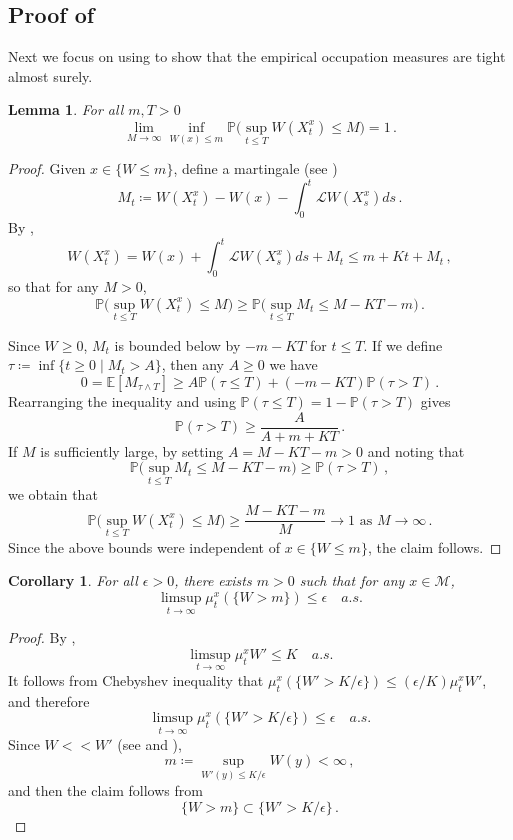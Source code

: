 \documentclass[final]{amsart}
\newtheorem{lem}[thm]{Lemma}
\newtheorem{cor}[thm]{Corollary}
\numberwithin{thm}{section}
\numberwithin{equation}{section}
\newcommand{\E}{\mathbb{E}}
\newcommand{\Prb}{\mathbb{P}}
\newcommand{\mcM}{\mathcal{M}}
\newcommand{\Ll}{\mathcal{L}}
\begin{document}
\subsection{Proof of }
Next we focus on using  to show that the empirical occupation measures are tight almost surely.

\begin{lem} \label{W-small-M}
For all $m, T > 0$
 \begin{equation*}
        \lim_{M \to \infty} \inf_{W(x) \leq m} \Prb\Big(\sup_{t \leq T}W(X_t^x) \leq M \Big) = 1 \,.
    \end{equation*}
\end{lem}

\begin{proof}
    Given $x \in \{W \leq m\}$, define a martingale (see )
    $$
    M_t \coloneqq W(X_t^x) - W(x) - \int_0^t \Ll W(X_s^x)ds \,.
    $$
     By , 
     $$
     W(X_t^x) = W(x) + \int_0^t \Ll W(X_s^x)ds + M_t \leq m + Kt + M_t \,,
     $$ 
     so that for any $M > 0$, 
     $$
     \Prb\Big(\sup_{t \leq T}W(X_t^x) \leq M \Big) \geq \Prb\Big(\sup_{t \leq T} M_t \leq M - KT - m\Big) \,.
     $$

    Since $W \geq 0$,  $M_t$ is bounded below by $-m - KT$ for $t \leq T$. If we define $\tau \coloneqq \inf\{t \geq 0 \mid M_t > A\}$, then 
     any $A \geq 0$ we have  
    $$
    0 = \E[M_{\tau \wedge T}] \geq A\Prb(\tau \leq T) + (-m - KT)\Prb(\tau > T) \,.
    $$ 
     Rearranging the inequality and using $\Prb(\tau \leq T) = 1 - \Prb(\tau > T)$ gives $$\Prb(\tau > T) \geq \frac{A}{A + m + KT} \,.$$
If $M$ is sufficiently large, by 
    setting $A = M - KT - m > 0$ and noting that $$\Prb\Big(\sup_{t \leq T} M_t \leq M - KT - m\Big) \geq \Prb(\tau > T) \,,$$ we obtain that $$\Prb\Big(\sup_{t \leq T}W(X_t^x) \leq M \Big) \geq \frac{M - KT - m}{M} \to 1 \text{ as } M \to \infty \,.$$ Since the above bounds were independent of $x \in \{W \leq m\}$, the claim follows.
    
\end{proof}



\begin{cor} \label{W-small-m}
    For all $\epsilon > 0$, there exists $m > 0$ such that for any $x \in \mcM$, $$\limsup_{t \to \infty} \mu_t^x(\{W > m\}) \leq \epsilon \quad a.s.$$
\end{cor}

\begin{proof}
    By ,
    $$
    \limsup_{t \to \infty} \mu_t^x W' \leq K \quad a.s.
    $$
It follows from Chebyshev inequality that $\mu_t^x(\{W' > K/\epsilon\}) \leq (\epsilon / K) \mu_t^x W'$, and therefore  
$$
\limsup_{t \to \infty} \mu_t^x(\{W' > K/\epsilon\}) \leq \epsilon \quad a.s.
$$
    Since $W << W'$ (see  and \Cref{<<}), $$m \coloneqq \sup_{W'(y) \leq K/\epsilon} W(y) < \infty \,,$$ and then the claim follows from $$\{W > m\} \subset \{W' > K/\epsilon\} \,.$$
\end{proof}
\end{document}
